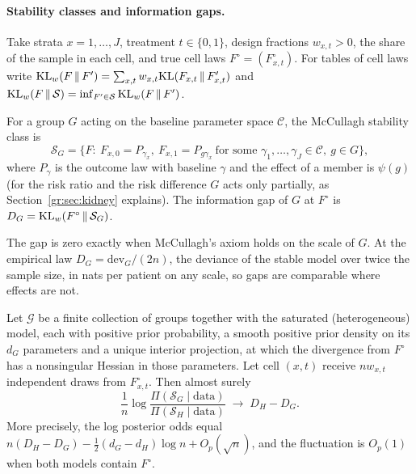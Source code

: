 \paragraph{Stability classes and information gaps.}
Take strata $x=1,\dots,J$, treatment $t\in\{0,1\}$, design fractions $w_{x,t}>0$, the share of the sample in each cell, and true cell laws $F^{\circ}=(F^{\circ}_{x,t})$. For tables of cell laws write $\mathrm{KL}_w(F\,\|\,F')=\sum_{x,t}w_{x,t}\mathrm{KL}(F_{x,t}\,\|\,F'_{x,t})$ and $\mathrm{KL}_w(F\,\|\,\mathcal S)=\inf_{F'\in\mathcal S}\mathrm{KL}_w(F\,\|\,F')$.

\begin{definition}\label{gr:def:stable}
For a group $G$ acting on the baseline parameter space $\mathcal C$, the McCullagh stability class is
\[
\mathcal S_G=\bigl\{F:\ F_{x,0}=P_{\gamma_x},\ F_{x,1}=P_{g\gamma_x}\ \text{for some } \gamma_1,\dots,\gamma_J\in\mathcal C,\ g\in G\bigr\},
\]
where $P_\gamma$ is the outcome law with baseline $\gamma$ and the effect of a member is $\psi(g)$ (for the risk ratio and the risk difference $G$ acts only partially, as Section~\ref{gr:sec:kidney} explains). The information gap of $G$ at $F^{\circ}$ is $D_G=\mathrm{KL}_w(F^{\circ}\,\|\,\mathcal S_G)$.
\end{definition}

The gap is zero exactly when McCullagh's axiom holds on the scale of $G$. At the empirical law $D_G=\mathrm{dev}_G/(2n)$, the deviance of the stable model over twice the sample size, in nats per patient on any scale, so gaps are comparable where effects are not.

\begin{theorem}\label{gr:thm:select}
Let $\mathcal G$ be a finite collection of groups together with the saturated (heterogeneous) model, each with positive prior probability, a smooth positive prior density on its $d_G$ parameters and a unique interior projection, at which the divergence from $F^{\circ}$ has a nonsingular Hessian in those parameters. Let cell $(x,t)$ receive $nw_{x,t}$ independent draws from $F^{\circ}_{x,t}$. Then almost surely
\[
\frac1n\log\frac{\Pi(\mathcal S_G\mid\text{data})}{\Pi(\mathcal S_H\mid\text{data})}\;\longrightarrow\;D_H-D_G .
\]
More precisely, the log posterior odds equal $n(D_H-D_G)-\tfrac12(d_G-d_H)\log n+O_p(\sqrt n)$, and the fluctuation is $O_p(1)$ when both models contain $F^{\circ}$.
\end{theorem}

